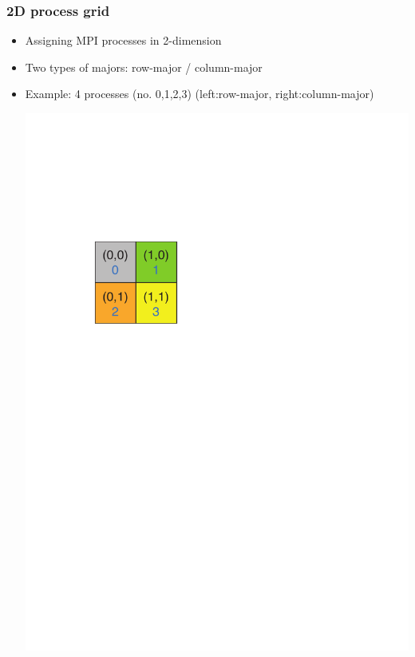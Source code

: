 \begin{frame}
  \frametitle{2D process grid}
  \begin{itemize}
  \item Assigning MPI processes in 2-dimension
  \item Two types of majors: row-major / column-major
  \item Example: 4 processes (no. {\color{blue}0,1,2,3}) (left:row-major, right:column-major)
  \begin{center}
    \includegraphics[height=0.25\textheight]{figure/grid-row-major.pdf} \ \ \ \

\end{center}
\end{itemize}
\end{frame}
